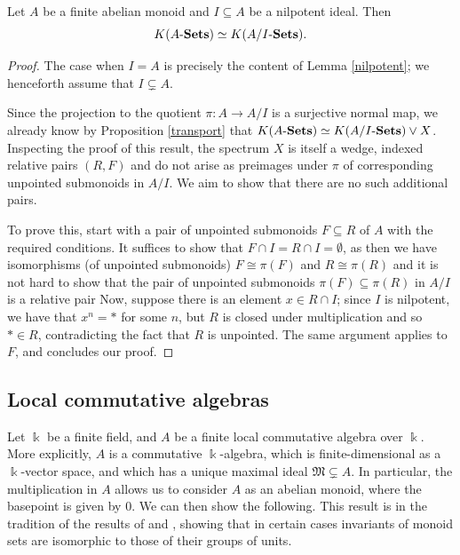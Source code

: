 \documentclass[11pt]{amsart}
\begin{document}
 \begin{proposition}\label{nilpotent.quotient}
     Let $A$ be a finite abelian monoid and $I\subseteq A$ be a nilpotent ideal. Then $$K(A\text{-}\mathbf{Sets})\simeq K(A/I\text{-}\mathbf{Sets}).$$
 \end{proposition}
\begin{proof}
The case when $I=A$ is precisely the content of Lemma \ref{nilpotent}; we henceforth assume that $I\subsetneq A$.

    Since the projection to the quotient $\pi\colon A\to A/I$ is a surjective normal map, we already know by Proposition \ref{transport} that $K(A\text{-}\mathbf{Sets})\simeq K(A/I\text{-}\mathbf{Sets})\vee X$. Inspecting the proof of this result, the spectrum $X$ is itself a wedge, indexed relative pairs $(R,F)$ %
    and do not arise as preimages under $\pi$ of corresponding unpointed submonoids in $A/I$. We aim to show that there are no such additional pairs.

    To prove this, start with a pair of unpointed submonoids $F\subseteq R$ of $A$ with the required conditions. It suffices to show that $F\cap I=R\cap I=\emptyset$, as then we have isomorphisms (of unpointed submonoids) $F\cong \pi(F)$ and $R\cong \pi(R)$ and it is not hard to show that the pair of unpointed submonoids $\pi(F)\subseteq \pi(R)$ in $A/I$ is a relative pair %
    Now, suppose there is an element $x\in R\cap I$; since $I$ is nilpotent, we have that $x^n=*$ for some $n$, but $R$ is closed under multiplication and so $*\in R$, contradicting the fact that $R$ is unpointed. The same argument applies to $F$, and concludes our proof.
    \end{proof}

    \subsection{Local commutative algebras}

    Let $\Bbbk$ be a finite field, and $A$ be a finite local commutative algebra over $\Bbbk$. More explicitly, $A$ is a commutative $\Bbbk$-algebra, which is finite-dimensional as a $\Bbbk$-vector space, and which has a unique maximal ideal $\mathfrak{M}\subsetneq A$. In particular, the multiplication in $A$ allows us to consider $A$ as an abelian monoid, where the basepoint is given by $0$. We can then show the following.  This result is in the tradition of the results of \cite[Lemma 3.3]{Hchuck} and \cite[Remark 2]{deitmar06}, showing that in certain cases invariants of monoid sets are isomorphic to those of their groups of units.
\end{document}
